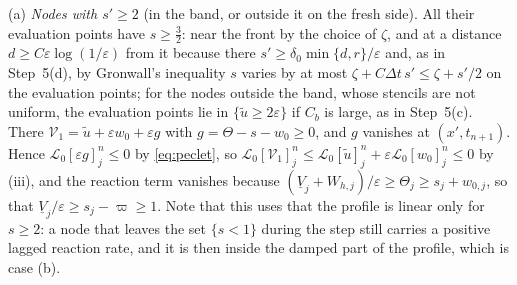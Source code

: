 \documentclass[11pt]{amsart}
\theoremstyle{definition}
\theoremstyle{remark}
\newcommand{\ve}{\varepsilon}
\newcommand{\Lop}{\mathcal{L}}
\begin{document}
(a) \emph{Nodes with $s'\ge2$} (in the band, or outside it on the fresh side). All their
evaluation points have $s\ge\frac32$: near the front by the choice of $\zeta$, and at a distance
$d\ge C\ve\log(1/\ve)$ from it because there $s'\ge\delta_0\min\{d,r\}/\ve$ and, as in
Step~5(d), by Gronwall's inequality $s$ varies by at most $\zeta+C\Delta t\,s'\le\zeta+s'/2$ on
the evaluation points; for the nodes outside the band, whose stencils are not uniform,
the evaluation points lie in $\{\tilde u\ge2\ve\}$ if $C_b$ is large, as in Step~5(c). There $\mathcal V_1=\tilde u+\ve w_0+\ve g$ with $g=\Theta-s-w_0\ge0$, and $g$
vanishes at $(x',t_{n+1})$. Hence $\Lop_0[\ve g]^n_j\le0$ by \eqref{eq:peclet}, so
$\Lop_0[\mathcal V_1]^n_j\le\Lop_0[\tilde u]^n_j+\ve\Lop_0[w_0]^n_j\le0$ by (iii), and the reaction term
vanishes because $(\underline V_j+W_{h,j})/\ve\ge\Theta_j\ge s_j+w_{0,j}$, so that
$\underline V_j/\ve\ge s_j-\varpi\ge1$. Note that this uses that the profile is
linear only for $s\ge2$: a node that leaves the set $\{s<1\}$ during the step still carries
a positive lagged reaction rate, and it is then inside the damped part of the profile,
which is case (b).
\end{document}
